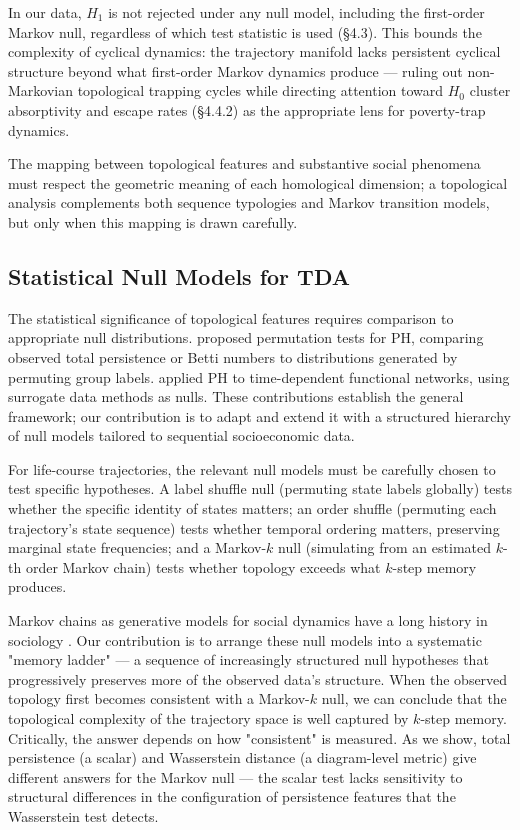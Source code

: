 In our data, $H_1$ is not rejected under any null model, including the first-order Markov null, regardless of which test statistic is used (\S4.3). This bounds the complexity of cyclical dynamics: the trajectory manifold lacks persistent cyclical structure beyond what first-order Markov dynamics produce --- ruling out non-Markovian topological trapping cycles while directing attention toward $H_0$ cluster absorptivity and escape rates (\S4.4.2) as the appropriate lens for poverty-trap dynamics.

The mapping between topological features and substantive social phenomena must respect the geometric meaning of each homological dimension; a topological analysis complements both sequence typologies and Markov transition models, but only when this mapping is drawn carefully.

\subsection{Statistical Null Models for TDA}

The statistical significance of topological features requires comparison to appropriate null distributions. \citet{robinson2017hypothesis} proposed permutation tests for PH, comparing observed total persistence or Betti numbers to distributions generated by permuting group labels. \citet{stolz2017persistent} applied PH to time-dependent functional networks, using surrogate data methods as nulls. These contributions establish the general framework; our contribution is to adapt and extend it with a structured hierarchy of null models tailored to sequential socioeconomic data.

For life-course trajectories, the relevant null models must be carefully chosen to test specific hypotheses. A label shuffle null (permuting state labels globally) tests whether the specific identity of states matters; an order shuffle (permuting each trajectory's state sequence) tests whether temporal ordering matters, preserving marginal state frequencies; and a Markov-$k$ null (simulating from an estimated $k$-th order Markov chain) tests whether topology exceeds what $k$-step memory produces.

Markov chains as generative models for social dynamics have a long history in sociology \citep{singer1976representation}. Our contribution is to arrange these null models into a systematic "memory ladder" --- a sequence of increasingly structured null hypotheses that progressively preserves more of the observed data's structure. When the observed topology first becomes consistent with a Markov-$k$ null, we can conclude that the topological complexity of the trajectory space is well captured by $k$-step memory. Critically, the answer depends on how "consistent" is measured. As we show, total persistence (a scalar) and Wasserstein distance (a diagram-level metric) give different answers for the Markov null --- the scalar test lacks sensitivity to structural differences in the configuration of persistence features that the Wasserstein test detects.


